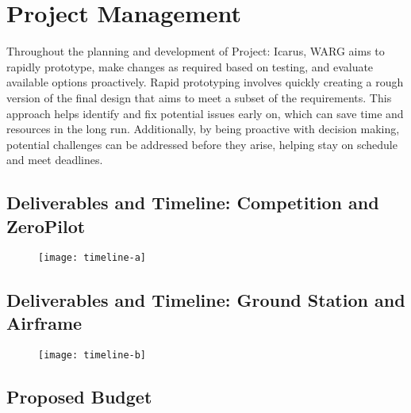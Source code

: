 \section{Project Management}
\label{sec:project-management}

Throughout the planning and development of Project: Icarus, WARG aims to
rapidly prototype, make changes as required based on testing, and evaluate
available options proactively. Rapid prototyping involves quickly creating a
rough version of the final design that aims to meet a subset of the
requirements. This approach helps identify and fix potential issues early on,
which can save time and resources in the long run. Additionally, by being
proactive with decision making, potential challenges can be addressed before
they arise, helping stay on schedule and meet deadlines.

\clearpage

\subsection{Deliverables and Timeline: Competition and ZeroPilot}
\label{sec:timeline}

\begin{figure}[H]
        \centering
        \texttt{[image: timeline-a]}
\end{figure}

\clearpage

\subsection{Deliverables and Timeline: Ground Station and Airframe}
\label{sec:timeline}

\begin{figure}[H]
        \centering
        \texttt{[image: timeline-b]}
\end{figure}

\clearpage

\subsection{Proposed Budget}
\label{sec:budget}

